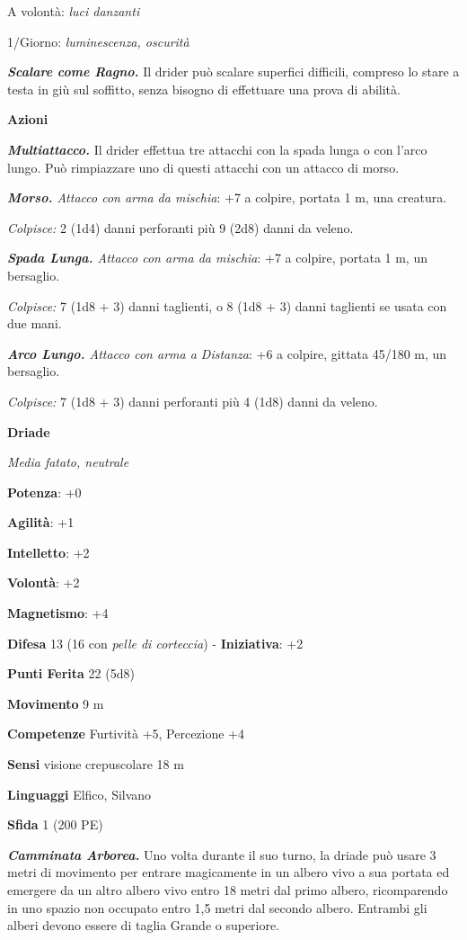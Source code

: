 \begin{multicols}{2}
A volontà: \emph{luci danzanti}

1/Giorno: \emph{luminescenza, oscurità}

\emph{\textbf{Scalare come Ragno.}} Il drider può scalare superfici
difficili, compreso lo stare a testa in giù sul soffitto, senza bisogno
di effettuare una prova di abilità.

\smallskip\textbf{Azioni}

\emph{\textbf{Multiattacco.}} Il drider effettua tre attacchi con la
spada lunga o con l'arco lungo. Può rimpiazzare uno di questi attacchi
con un attacco di morso.

\emph{\textbf{Morso.} Attacco con arma da mischia}: +7 a colpire,
portata 1 m, una creatura.

\emph{Colpisce:} 2 (1d4) danni perforanti più 9 (2d8) danni da veleno.

\emph{\textbf{Spada Lunga.} Attacco con arma da mischia}: +7 a colpire,
portata 1 m, un bersaglio.

\emph{Colpisce:} 7 (1d8 + 3) danni taglienti, o 8 (1d8 + 3) danni
taglienti se usata con due mani.

\emph{\textbf{Arco Lungo.} Attacco con arma a Distanza}: +6 a colpire,
gittata 45/180 m, un bersaglio.

\emph{Colpisce:} 7 (1d8 + 3) danni perforanti più 4 (1d8) danni da
veleno.

\textbf{Driade}

\emph{Media fatato, neutrale}

\textbf{Potenza}: +0

\textbf{Agilità}: +1

\textbf{Intelletto}: +2

\textbf{Volontà}: +2

\textbf{Magnetismo}: +4

\textbf{Difesa} 13 (16 con \emph{pelle di corteccia}) - \textbf{Iniziativa}: +2

\textbf{Punti Ferita} 22 (5d8)

\textbf{Movimento} 9 m

\textbf{Competenze} Furtività +5, Percezione +4

\textbf{Sensi} visione crepuscolare 18 m

\textbf{Linguaggi} Elfico, Silvano

\textbf{Sfida} 1 (200 PE)\smallskip

\emph{\textbf{Camminata Arborea.}} Uno volta durante il suo turno, la
driade può usare 3 metri di movimento per entrare magicamente in un
albero vivo a sua portata ed emergere da un altro albero vivo entro 18
metri dal primo albero, ricomparendo in uno spazio non occupato entro
1,5 metri dal secondo albero. Entrambi gli alberi devono essere di
taglia Grande o superiore.


\end{multicols}
